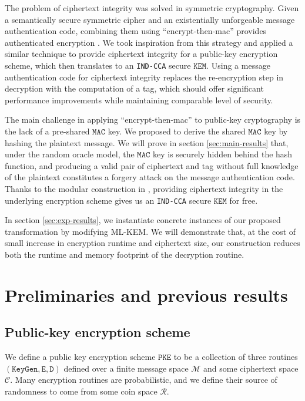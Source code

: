 \documentclass[floatrow,journal=tches,submission]{iacrtrans}
\newcommand{\monospace}{\texttt}
\newcommand{\pke}{\monospace{PKE}}
\newcommand{\keygen}{\monospace{KeyGen}}
\newcommand{\encrypt}{\monospace{E}}
\newcommand{\decrypt}{\monospace{D}}
\newcommand{\kem}{\monospace{KEM}}
\newcommand{\mac}{\monospace{MAC}}
\begin{document}
The problem of ciphertext integrity was solved in symmetric cryptography. Given a semantically secure symmetric cipher and an existentially unforgeable message authentication code, combining them using ``encrypt-then-mac'' provides authenticated encryption \cite{bellare2000authenticated}. We took inspiration from this strategy and applied a similar technique to provide ciphertext integrity for a public-key encryption scheme, which then translates to an \monospace{IND-CCA} secure $\kem$. Using a message authentication code for ciphertext integrity replaces the re-encryption step in decryption with the computation of a tag, which should offer significant performance improvements while maintaining comparable level of security.

The main challenge in applying ``encrypt-then-mac'' to public-key cryptography is the lack of a pre-shared $\mac$ key. We proposed to derive the shared $\mac$ key by hashing the plaintext message. We will prove in section \ref{sec:main-results} that, under the random oracle model, the $\mac$ key is securely hidden behind the hash function, and producing a valid pair of ciphertext and tag without full knowledge of the plaintext constitutes a forgery attack on the message authentication code. Thanks to the modular construction in \cite{hofheinz2017modular}, providing ciphertext integrity in the underlying encryption scheme gives us an \monospace{IND-CCA} secure $\kem$ for free.

In section \ref{sec:exp-results}, we instantiate concrete instances of our proposed transformation by modifying ML-KEM. We will demonstrate that, at the cost of small increase in encryption runtime and ciphertext size, our construction reduces both the runtime and memory footprint of the decryption routine. %

\section{Preliminaries and previous results}

\subsection{Public-key encryption scheme}
We define a public key encryption scheme $\pke$ to be a collection of three routines $(\keygen, \encrypt, \decrypt)$ defined over a finite message space $\mathcal{M}$ and some ciphertext space $\mathcal{C}$. Many encryption routines are probabilistic, and we define their source of randomness to come from some coin space $\mathcal{R}$.
\end{document}
